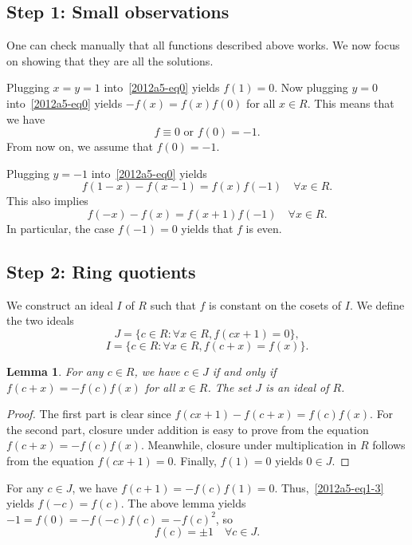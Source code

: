 \documentclass{article}
\newtheorem{lemma}{Lemma}
\begin{document}
\subsection*{Step 1: Small observations}

One can check manually that all functions described above works.
We now focus on showing that they are all the solutions.

Plugging $x = y = 1$ into~\eqref{2012a5-eq0} yields $f(1) = 0$.
Now plugging $y = 0$ into~\eqref{2012a5-eq0} yields $-f(x) = f(x) f(0)$ for all $x \in R$.
This means that we have
\[ f \equiv 0 \text{ or } f(0) = -1. \tag{1.1}\label{2012a5-eq1-1} \]
From now on, we assume that $f(0) = -1$.

Plugging $y = -1$ into~\eqref{2012a5-eq0} yields
\[ f(1 - x) - f(x - 1) = f(x) f(-1) \quad \forall x \in R. \tag{1.2}\label{2012a5-eq1-2} \]
This also implies
\[ f(-x) - f(x) = f(x + 1) f(-1) \quad \forall x \in R. \tag{1.3}\label{2012a5-eq1-3} \]
In particular, the case $f(-1) = 0$ yields that $f$ is even.









\subsection*{Step 2: Ring quotients}

We construct an ideal $I$ of $R$ such that $f$ is constant on the cosets of $I$.
We define the two ideals
\[ J = \{c \in R : \forall x \in R, f(cx + 1) = 0\}, \tag{2.1}\label{2012a5-eq2-1} \]
\[ I = \{c \in R : \forall x \in R, f(c + x) = f(x)\}. \tag{2.2}\label{2012a5-eq2-2} \]

\begin{lemma}\label{2012a5-2-1}
For any $c \in R$, we have $c \in J$ if and only if $f(c + x) = -f(c) f(x)$ for all $x \in R$.
The set $J$ is an ideal of $R$.
\end{lemma}
\begin{proof}
The first part is clear since $f(cx + 1) - f(c + x) = f(c) f(x)$.
For the second part, closure under addition is easy to prove from the equation $f(c + x) = -f(c) f(x)$.
Meanwhile, closure under multiplication in $R$ follows from the equation $f(cx + 1) = 0$.
Finally, $f(1) = 0$ yields $0 \in J$.
\end{proof}

For any $c \in J$, we have $f(c + 1) = -f(c) f(1) = 0$.
Thus,~\eqref{2012a5-eq1-3} yields $f(-c) = f(c)$.
The above lemma yields $-1 = f(0) = -f(-c) f(c) = -f(c)^2$, so
\[ f(c) = \pm 1 \quad \forall c \in J. \tag{2.3}\label{2012a5-eq2-3} \]
\end{document}
